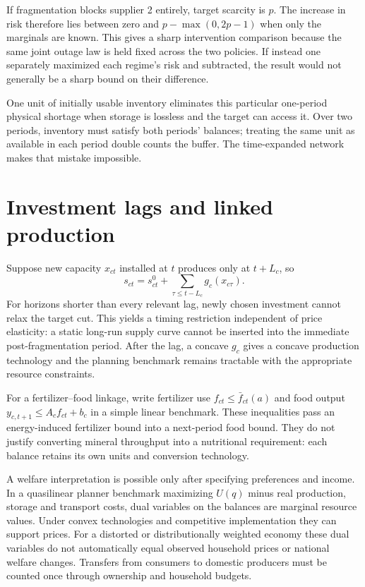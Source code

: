 \documentclass[11pt]{article}
\begin{document}
If fragmentation blocks supplier 2 entirely, target scarcity is $p$. The increase in risk therefore lies between zero and $p-\max(0,2p-1)$ when only the marginals are known. This gives a sharp intervention comparison because the same joint outage law is held fixed across the two policies. If instead one separately maximized each regime's risk and subtracted, the result would not generally be a sharp bound on their difference.

One unit of initially usable inventory eliminates this particular one-period physical shortage when storage is lossless and the target can access it. Over two periods, inventory must satisfy both periods' balances; treating the same unit as available in each period double counts the buffer. The time-expanded network makes that mistake impossible.

\section*{Investment lags and linked production}
Suppose new capacity $x_{ct}$ installed at $t$ produces only at $t+L_c$, so
\[
 s_{ct}=s^0_{ct}+\sum_{\tau\leq t-L_c}g_c(x_{c\tau}).
\]
For horizons shorter than every relevant lag, newly chosen investment cannot relax the target cut. This yields a timing restriction independent of price elasticity: a static long-run supply curve cannot be inserted into the immediate post-fragmentation period. After the lag, a concave $g_c$ gives a concave production technology and the planning benchmark remains tractable with the appropriate resource constraints.

For a fertilizer--food linkage, write fertilizer use $f_{ct}\leq\bar f_{ct}(a)$ and food output $y_{c,t+1}\leq A_cf_{ct}+b_c$ in a simple linear benchmark. These inequalities pass an energy-induced fertilizer bound into a next-period food bound. They do not justify converting mineral throughput into a nutritional requirement: each balance retains its own units and conversion technology.

A welfare interpretation is possible only after specifying preferences and income. In a quasilinear planner benchmark maximizing $U(q)$ minus real production, storage and transport costs, dual variables on the balances are marginal resource values. Under convex technologies and competitive implementation they can support prices. For a distorted or distributionally weighted economy these dual variables do not automatically equal observed household prices or national welfare changes. Transfers from consumers to domestic producers must be counted once through ownership and household budgets.
\end{document}
